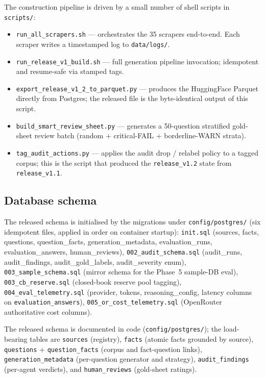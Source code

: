 The construction pipeline is driven by a small number of shell scripts
in \texttt{scripts/}:

\begin{itemize}\itemsep -1pt
  \item \texttt{run\_all\_scrapers.sh} — orchestrates the 35 scrapers
    end-to-end. Each scraper writes a timestamped log to
    \texttt{data/logs/}.
  \item \texttt{run\_release\_v1\_build.sh} — full generation pipeline
    invocation; idempotent and resume-safe via stamped tags.
  \item \texttt{export\_release\_v1\_2\_to\_parquet.py} — produces the
    HuggingFace Parquet directly from Postgres; the released file
    is the byte-identical output of this script.
  \item \texttt{build\_smart\_review\_sheet.py} — generates a 50-question
    stratified gold-sheet review batch (random + critical-FAIL +
    borderline-WARN strata).
  \item \texttt{tag\_audit\_actions.py} — applies the audit drop /
    relabel policy to a tagged corpus; this is the script that
    produced the \texttt{release\_v1.2} state from
    \texttt{release\_v1.1}.
\end{itemize}

\subsection{Database schema}

The released schema is initialised by the migrations under
\texttt{config/postgres/} (six idempotent files, applied in order on
container startup):
\texttt{init.sql} (sources, facts, questions, question\_facts,
generation\_metadata, evaluation\_runs, evaluation\_answers,
human\_reviews),
\texttt{002\_audit\_schema.sql} (audit\_runs, audit\_findings,
audit\_gold\_labels, audit\_severity enum),
\texttt{003\_sample\_schema.sql} (mirror schema for the Phase~5
sample-DB eval),
\texttt{003\_cb\_reserve.sql} (closed-book reserve pool tagging),
\texttt{004\_eval\_telemetry.sql} (provider, tokens, reasoning\_config,
latency columns on \texttt{evaluation\_answers}),
\texttt{005\_or\_cost\_telemetry.sql} (OpenRouter authoritative cost
columns).

The released schema is documented in code
(\texttt{config/postgres/}); the load-bearing tables are
\texttt{sources} (registry), \texttt{facts} (atomic facts grounded by
source), \texttt{questions} + \texttt{question\_facts} (corpus and
fact-question links), \texttt{generation\_metadata} (per-question
generator and strategy), \texttt{audit\_findings} (per-agent
verdicts), and \texttt{human\_reviews} (gold-sheet ratings).

